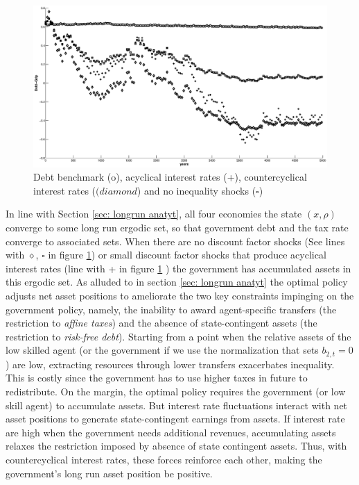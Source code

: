 \documentclass[thmsb,11pt]{article}
\begin{document}
{  \begin{figure}[htp]
 \centering
 \includegraphics[width=\textwidth]{Draft25Graphs/LongSimulations.eps}
 \caption{Debt benchmark (o), acyclical interest rates (+), countercyclical interest rates ($(diamond$) and no inequality shocks \scriptsize ($\square$\normalsize) }
 \label{fig:LongSimulations}
 \end{figure}

\smallskip


In line with Section \ref{sec: longrun anatyt}, all four economies the state $(x,\rho)$   converge to some long run
ergodic set, so that government debt and the tax rate converge to associated sets. When there are no discount factor shocks
(See lines with {$\diamond$, \scriptsize  $\square$ \normalsize}in figure \ref{fig:LongSimulations}) or small discount factor shocks that produce acyclical interest rates (line with + in figure \ref{fig:LongSimulations} )
the government has accumulated assets in this ergodic set. As alluded to in section \ref{sec: longrun anatyt} %
 the optimal policy adjusts  net asset
positions to ameliorate the two key constraints impinging  on the government policy, namely,
the inability to award agent-specific transfers (the restriction to \emph{affine taxes}) and the  absence of state-contingent assets (the
restriction to \emph {risk-free debt}). Starting from a point when the
relative assets of the low skilled agent (or the government if we use the
 normalization that sets $b_{2,t} = 0$) are low, extracting resources through lower
transfers exacerbates inequality. This is costly since the government has to
use higher taxes in future to redistribute. On the margin, the optimal policy requires the government (or low skill agent) to accumulate assets. But  interest rate
fluctuations interact with net asset positions to generate state-contingent  earnings
from assets. If interest rate are high when the government needs additional
revenues, accumulating assets relaxes the restriction imposed by absence
of state contingent assets. Thus, with countercyclical interest rates, these
forces reinforce each other, making the government's  long run asset position be positive.

}
\end{document}
